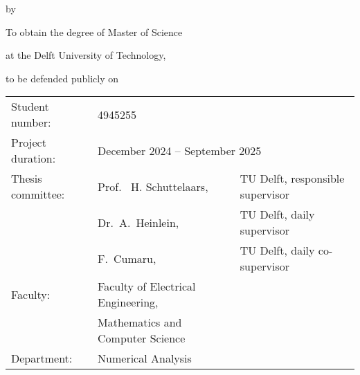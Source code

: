 \begin{titlepage}

    \begin{center}

        {\makeatletter
            \largecoverstyle\fontsize{45}{45}\selectfont\@title
            \makeatother}

        {\makeatletter
            \ifdefvoid{\@subtitle}{}{\bigskip\coverstyle\fontsize{20}{20}\selectfont\@subtitle}
            \makeatother}

        \bigskip
        \bigskip

        by

        \bigskip
        \bigskip

        {\makeatletter
            \coverstyle\fontsize{25}{25}\selectfont\@author
            \makeatother}

        \bigskip
        \bigskip

        To obtain the degree of Master of Science

        at the Delft University of Technology,


        to be defended publicly on {\makeatletter
                \makeatother}

        \vfill

        \begin{tabular}{lll}
            Student number:   & 4945255                                                                                \\
            Project duration: & \multicolumn{2}{l}{December 2024 -- September 2025}                                    \\
            Thesis committee: & Prof. \ H. Schuttelaars,                            & TU Delft, responsible supervisor \\
                              & Dr.\ A.\ Heinlein,                                  & TU Delft, daily supervisor       \\
                              & F.\ Cumaru,                                         & TU Delft, daily co-supervisor    \\
            Faculty:          & Faculty of Electrical Engineering,                                                     \\
                              & Mathematics and Computer Science                                                       \\
            Department:       & Numerical Analysis                                                                     \\
        \end{tabular}


\end{center}
\end{titlepage}
